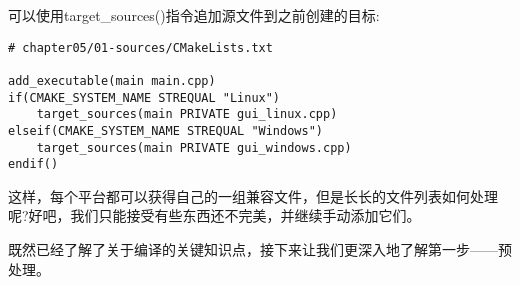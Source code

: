 可以使用target\_sources()指令追加源文件到之前创建的目标:

\begin{lstlisting}[style=styleCMake]
# chapter05/01-sources/CMakeLists.txt

add_executable(main main.cpp)
if(CMAKE_SYSTEM_NAME STREQUAL "Linux")
	target_sources(main PRIVATE gui_linux.cpp)
elseif(CMAKE_SYSTEM_NAME STREQUAL "Windows")
	target_sources(main PRIVATE gui_windows.cpp)
endif()
\end{lstlisting}

这样，每个平台都可以获得自己的一组兼容文件，但是长长的文件列表如何处理呢?好吧，我们只能接受有些东西还不完美，并继续手动添加它们。

既然已经了解了关于编译的关键知识点，接下来让我们更深入地了解第一步——预处理。























